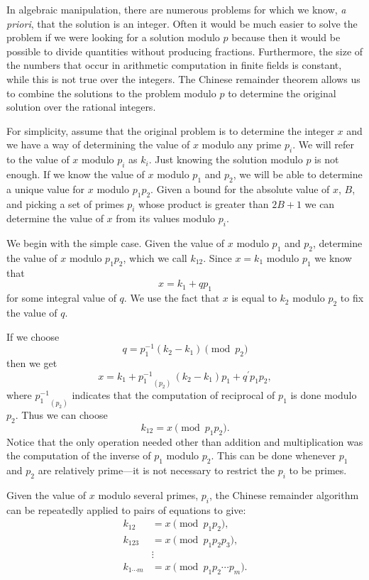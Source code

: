 In algebraic manipulation, there are numerous problems for which we
know, {\em a priori\/}, that the solution is an integer.  Often it
would be much easier to solve the problem if we were looking for a
solution modulo $p$ because then it would be possible to divide
quantities without producing fractions.  Furthermore, the size of the
numbers that occur in arithmetic computation in finite fields is
constant, while this is not true over the integers.  The Chinese
remainder theorem allows us to combine the solutions to the problem
modulo $p$ to determine the original solution over the rational
integers.

For simplicity, assume that the original problem is to determine the
integer $x$ and we have a way of determining the value of $x$ modulo
any prime $p_i$.  We will refer to the value of $x$ modulo $p_i$ as
$k_i$.  Just knowing the solution modulo $p$ is not enough.  If we
know the value of $x$ modulo $p_1$ and $p_2$, we will be able to
determine a unique value for $x$ modulo $p_1 p_2$.  Given a bound for
the absolute value of $x$, $B$, and picking a set of primes $p_i$
whose product is greater than $2B+1$ we can determine the value of $x$
from its values modulo $p_i$.

We begin with the simple case.  Given the value of $x$ modulo $p_1$
and $p_2$, determine the value of $x$ modulo $p_1 p_2$, which we call
$k_{12}$.  Since $x = k_1$ modulo $p_1$ we know that
\[
x = k_1 + q p_1
\]
for some integral value of $q$.  We use the fact that $x$ is equal to
$k_2$ modulo $p_2$ to fix the value of $q$.

If we choose 
\[
q = p_1^{-1} (k_2 - k_1) \pmod{p_2}
\]
then we get
\[
x = k_1 + {p_1^{-1}}_{(p_2)}\,(k_2 - k_1) p_1 + q^{\prime} p_1
p_2,
\]
where ${p_1^{-1}}_{(p_2)}$ indicates that the computation of reciprocal
of $p_1$ is done modulo $p_2$.  Thus we can choose 
\[
k_{12} = x \pmod{p_1 p_2}.
\]
Notice that the only operation needed other than addition and multiplication
was the  computation of the inverse of $p_1$ modulo $p_2$.  This can be done
whenever $p_1$ and $p_2$ are relatively prime---it is not necessary to
restrict the $p_i$ to be primes.

\smallskip
Given the value of $x$ modulo several primes, $p_i$, the Chinese
remainder algorithm can be repeatedly applied to pairs of equations to
give:
\[
\begin{aligned}
  k_{12}&= x \pmod{p_1 p_2}, \\
  k_{123}&= x \pmod{p_1 p_2 p_3}, \\
    & \vdots\\
  k_{1 \cdots m}&= x \pmod{p_1 p_2 \cdots p_m}.
\end{aligned}
\]

